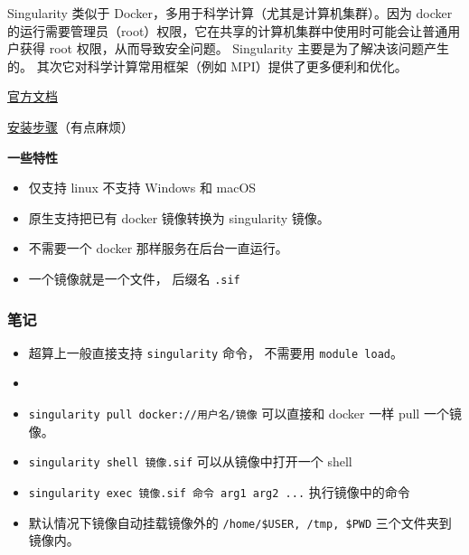 
\begin{issues}
\issueDraft
\end{issues}

Singularity 类似于 Docker，多用于科学计算（尤其是计算机集群）。因为 docker 的运行需要管理员（root）权限，它在共享的计算机集群中使用时可能会让普通用户获得 root 权限，从而导致安全问题。 Singularity 主要是为了解决该问题产生的。 其次它对科学计算常用框架（例如 MPI）提供了更多便利和优化。

\href{https://docs.sylabs.io/guides/3.0/user-guide/index.html}{官方文档}

\href{https://docs.sylabs.io/guides/3.0/user-guide/quick_start.html#quick-installation-steps}{安装步骤}（有点麻烦）

\textbf{一些特性}
\begin{itemize}
\item 仅支持 linux 不支持 Windows 和 macOS
\item 原生支持把已有 docker 镜像转换为 singularity 镜像。
\item 不需要一个 docker 那样服务在后台一直运行。
\item 一个镜像就是一个文件， 后缀名 \verb|.sif|
\end{itemize}


\subsubsection{笔记}
\begin{itemize}
\item 超算上一般直接支持 \verb|singularity| 命令， 不需要用 \verb|module load|。
\item \item \verb|singularity pull docker://用户名/镜像| 可以直接和 docker 一样 pull 一个镜像。
\item \verb|singularity shell 镜像.sif| 可以从镜像中打开一个 shell
\item \verb|singularity exec 镜像.sif 命令 arg1 arg2 ...| 执行镜像中的命令
\item 默认情况下镜像自动挂载镜像外的 \verb|/home/$USER, /tmp, $PWD| 三个文件夹到镜像内。
\end{itemize}
